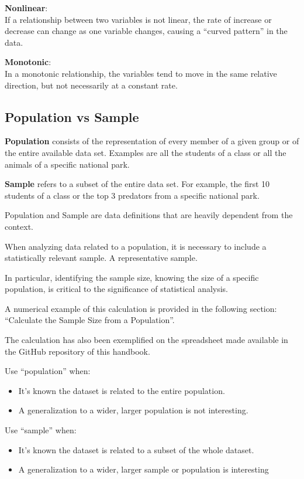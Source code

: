 \documentclass{article}
\begin{document}
\textbf{Nonlinear}: \\
If a relationship between two variables is not linear, the rate of increase or decrease can change as one variable changes, causing a “curved pattern” in the data.

\textbf{Monotonic}: \\
In a monotonic relationship, the variables tend to move in the same relative direction, but not necessarily at a constant rate.

\subsection{Population vs Sample}

\textbf{Population} consists of the representation of every member of a given group or of the entire available data set.
Examples are all the students of a class or all the animals of a specific national park.

\textbf{Sample} refers to a subset of the entire data set. 
For example, the first 10 students of a class or the top 3 predators from a specific national park.

Population and Sample are data definitions that are heavily dependent from the context.

When analyzing data related to a population, it is necessary to include a statistically relevant sample. A representative sample. 

In particular, identifying the sample size, knowing the size of a specific population, is critical to the significance of statistical analysis. 

A numerical example of this calculation is provided in the following section: “Calculate the Sample Size from a Population”.

The calculation has also been exemplified on the spreadsheet made available in the GitHub repository of this handbook.

Use “population” when:
\begin{itemize}
    \item It’s known the dataset is related to the entire population.
    \item A generalization to a wider, larger population is not interesting.
\end{itemize}

Use “sample” when:
\begin{itemize}
    \item It’s known the dataset is related to a subset of the whole dataset.
    \item A generalization to a wider, larger sample or population is interesting
\end{itemize}
\end{document}
